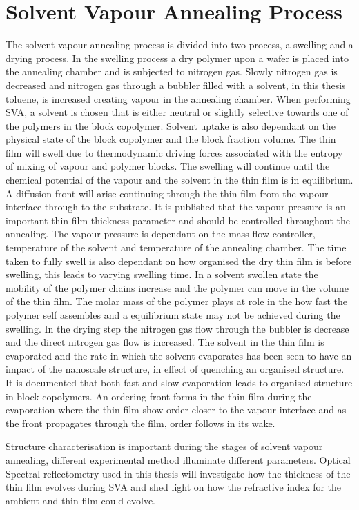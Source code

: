 \documentclass[MasterThesisMain.tex]{subfiles}
\begin{document}
\section{Solvent Vapour Annealing Process}
The solvent vapour annealing process is divided into two process, a swelling and a drying process. In the swelling process a dry polymer upon a wafer is placed into the annealing chamber and is subjected to nitrogen gas. Slowly nitrogen gas is decreased and nitrogen gas through a bubbler filled with a solvent, in this thesis toluene, is increased creating vapour in the annealing chamber. When performing SVA, a solvent is chosen that is either neutral or slightly selective towards one of the polymers in the block copolymer. Solvent uptake is also dependant on the physical state of the block copolymer and the block fraction volume. The thin film will swell due to thermodynamic driving forces associated with the entropy of mixing of vapour and polymer blocks. The swelling will continue until the chemical potential of the vapour and the solvent in the thin film is in equilibrium. A diffusion front will arise continuing through the thin film from the vapour interface through to the substrate. It is published that the vapour pressure is an important thin film thickness parameter and should be controlled throughout the annealing. The vapour pressure is dependant on the mass flow controller, temperature of the solvent and temperature of the annealing chamber. The time taken to fully swell is also dependant on how organised the dry thin film is before swelling, this leads to varying swelling time. In a solvent swollen state the mobility of the polymer chains increase and the polymer can move in the volume of the thin film. The molar mass of the polymer plays at role in the how fast the polymer self assembles and a equilibrium state may not be achieved during the swelling. In the drying step the nitrogen gas flow through the bubbler is decrease and the direct nitrogen gas flow is increased. The solvent in the thin film is evaporated and the rate in which the solvent evaporates has been seen to have an impact of the nanoscale structure, in effect of quenching an organised structure. It is documented that both fast and slow evaporation leads to organised structure in block copolymers. An ordering front forms in the thin film during the evaporation where the thin film show order closer to the vapour interface and as the front propagates through the film, order follows in its wake\cite{SVABCP}. 

Structure characterisation is important during the stages of solvent vapour annealing, different experimental method illuminate different parameters. Optical Spectral reflectometry used in this thesis will investigate how the thickness of the thin film evolves during SVA and shed light on how the refractive index for the ambient and thin film could evolve. 
\end{document}
